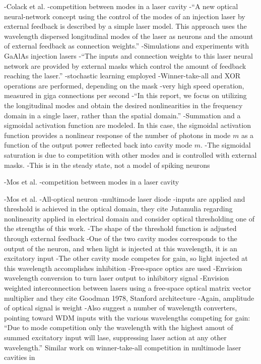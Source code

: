 \cite{cosc1996}
-Colack et al.
-competition between modes in a laser cavity
-``A new optical neural-network concept using the control of the modes of an injection laser by external feedback is described by a simple laser model. This approach uses the wavelength dispersed longitudinal modes of the laser as neurons and the amount of external feedback as connection weights.''
-Simulations and experiments with GaAlAs injection lasers
-``The inputs and connection weights to this laser neural network are provided by external masks which control the amount of feedback reaching the laser.''
-stochastic learning employed
-Winner-take-all and XOR operations are performed, depending on the mask
-very high speed operation, measured in giga connections per second
-``In this report, we focus on utilizing the longitudinal modes and obtain the desired nonlinearities in the frequency domain in a single laser, rather than the spatial domain.''
-Summation and a sigmoidal activation function are modeled. In this case, the sigmoidal activation function provides a nonlinear response of the number of photons in mode $m$ as a function of the output power reflected back into cavity mode $m$.
-The sigmoidal saturation is due to competition with other modes and is controlled with external masks.
-This is in the steady state, not a model of spiking neurons

\cite{mosc1997}
-Mos et al.
-competition between modes in a laser cavity

\cite{moho2000}
-Mos et al.
-All-optical neuron
-multimode laser diode
-inputs are applied and threshold is achieved in the optical domain, they cite Jutamulia \cite{juyu1996} regarding nonlinearity applied in electrical domain and consider optical thresholding one of the strengths of this work.
-The shape of the threshold function is adjusted through external feedback
-One of the two cavity modes corresponds to the output of the neuron, and when light is injected at this wavelength, it is an excitatory input
-The other cavity mode competes for gain, so light injected at this wavelength accomplishes inhibition
-Free-space optics are used
-Envision wavelength conversion to turn laser output to inhibitory signal
-Envision weighted interconnection between lasers using a free-space optical matrix vector multiplier and they cite Goodman 1978, Stanford architecture \cite{godi1978}
-Again, amplitude of optical signal is weight
-Also suggest a number of wavelength converters, pointing toward WDM inputs with the various wavelengths competing for gain: ``Due to mode competition only the wavelength with the highest amout of summed excitatory input will lase, suppressing laser action at any other wavelength.'' Similar work on winner-take-all competition in multimode laser cavities in \cite{cosc1996,mosc1997}

